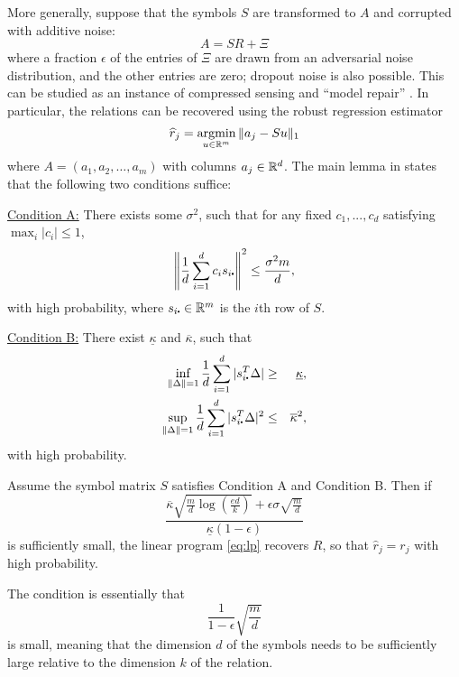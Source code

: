 More generally, suppose that the symbols $S$ are transformed to $A$ and corrupted with additive noise:
\begin{equation}
  A = SR + \Xi
\end{equation}
where a fraction $\epsilon$ of the entries of $\Xi$ are drawn from an adversarial noise distribution, and the other entries are zero; dropout noise is also possible.
This can be studied as an instance of compressed sensing and ``model repair'' \citep{candes_randall,model_repair}.  In particular, the relations can be recovered using the  robust regression estimator
\begin{equation}
  \hat r_j = \argmin_{u \in\reals^m} \| a_j - S u\|_1 \label{eq:lp}
\end{equation}
where $A = (a_1,a_2,\ldots, a_m)$ with columns $a_j\in\mathbb{R}^d$.
The main lemma in \cite{model_repair} states that the following two conditions suffice:

\underline{Condition A:}
  There exists some $\sigma^2$, such that for any fixed $c_1,...,c_d$ satisfying $\max_i|c_i|\leq 1$,
  \begin{equation}
    \left\|\frac{1}{d}\sum_{i=1}^d c_i s_{i\rdot} \right\|^2\leq \frac{\sigma^2 m}{d},
  \end{equation}
with high probability, where $s_{i\rdot}\in\reals^m$ is the $i$th row of $S$.

\underline{Condition B:}
  There exist $\underline{\kappa}$ and $\overline{\kappa}$, such that
  \begin{eqnarray}
  \label{eq:l1-upper-A} \inf_{\|\Delta\|=1}\frac{1}{d}\sum_{i=1}^d|s_{i\rdot}^T\Delta| &\geq& \underline{\kappa}, \\
  \label{eq:l2-upper-A} \sup_{\|\Delta\|=1}\frac{1}{d}\sum_{i=1}^d|s_{i\rdot}^T\Delta|^2 &\leq& \overline{\kappa}^2,
  \end{eqnarray}
  with high probability.

\begin{thm}\label{thm:main-improved}
  Assume the symbol matrix $S$ satisfies Condition A and Condition B. Then if
  \begin{equation}
  \frac{\overline{\kappa}\sqrt{\frac{m}{d}\log\left(\frac{e d}{k}\right)}+\epsilon\sigma\sqrt{\frac{m}{d}}}{\underline{\kappa}(1-\epsilon)}
  \end{equation}
  is sufficiently small, the linear program \eqref{eq:lp} recovers $R$, so that $\hat r_j = r_j$ with high probability.
  \end{thm}

The condition is essentially that
  \begin{equation}
    \frac{1}{1-\epsilon} \sqrt{\frac{m}{d}}
  \end{equation}
  is small, meaning that the dimension $d$ of the symbols needs to be sufficiently large relative
  to the dimension $k$ of the relation.

